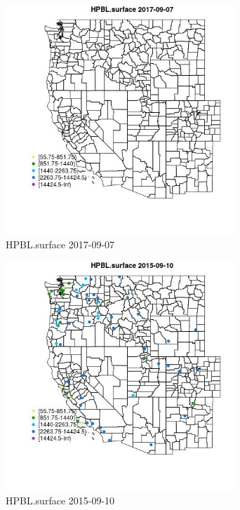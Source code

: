 \begin{figure} 
\centering  
\includegraphics[width=0.77\textwidth]{Code_Outputs/Report_ML_input_PM25_Step4_part_e_de_duplicated_aveswNAs_MapObsHPBLsurface2017-09-07.jpg} 
\caption{\label{fig:Report_ML_input_PM25_Step4_part_e_de_duplicated_aveswNAsMapObsHPBLsurface2017-09-07}HPBL.surface 2017-09-07} 
\end{figure} 
 

\clearpage 

\begin{figure} 
\centering  
\includegraphics[width=0.77\textwidth]{Code_Outputs/Report_ML_input_PM25_Step4_part_e_de_duplicated_aveswNAs_MapObsHPBLsurface2015-09-10.jpg} 
\caption{\label{fig:Report_ML_input_PM25_Step4_part_e_de_duplicated_aveswNAsMapObsHPBLsurface2015-09-10}HPBL.surface 2015-09-10} 
\end{figure} 
 

